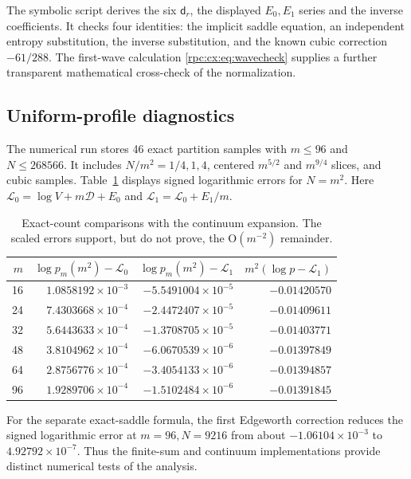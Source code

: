 \documentclass[11pt]{article}
\theoremstyle{definition}
\theoremstyle{remark}
\numberwithin{equation}{section}
\begin{document}
The symbolic script derives the six $\mathsf d_r$, the displayed $E_0,E_1$
series and the inverse coefficients. It checks four identities:
the implicit saddle equation, an independent entropy substitution,
the inverse substitution, and the known cubic correction $-61/288$.
The first-wave calculation \eqref{rpc:cx:eq:wavecheck} supplies a further
transparent mathematical cross-check of the normalization.

\subsection{Uniform-profile diagnostics}
The numerical run stores 46 exact partition samples with $m\le96$ and
$N\le268566$. It includes $N/m^2=1/4,1,4$, centered $m^{5/2}$ and
$m^{9/4}$ slices, and cubic samples. Table~\ref{rpc:cx:tab:errors} displays
signed logarithmic errors for $N=m^2$.
Here $\mathcal L_0=\log V+m\mathcal D+E_0$ and
$\mathcal L_1=\mathcal L_0+E_1/m$.

\begin{table}[ht]
\centering\small
\begin{tabular}{rrrr}
\toprule
$m$ & $\log p_m(m^2)-\mathcal L_0$ &
$\log p_m(m^2)-\mathcal L_1$ & $m^2(\log p-\mathcal L_1)$\\
\midrule
16 & $1.0858192\times10^{-3}$ & $-5.5491004\times10^{-5}$ & $-0.01420570$\\
24 & $7.4303668\times10^{-4}$ & $-2.4472407\times10^{-5}$ & $-0.01409611$\\
32 & $5.6443633\times10^{-4}$ & $-1.3708705\times10^{-5}$ & $-0.01403771$\\
48 & $3.8104962\times10^{-4}$ & $-6.0670539\times10^{-6}$ & $-0.01397849$\\
64 & $2.8756776\times10^{-4}$ & $-3.4054133\times10^{-6}$ & $-0.01394857$\\
96 & $1.9289706\times10^{-4}$ & $-1.5102484\times10^{-6}$ & $-0.01391845$\\
\bottomrule
\end{tabular}
\caption{Exact-count comparisons with the continuum expansion.
The scaled errors support, but do not prove, the $\mathrm O(m^{-2})$ remainder.}
\label{rpc:cx:tab:errors}
\end{table}

For the separate exact-saddle formula, the first Edgeworth correction
reduces the signed logarithmic error at $m=96,N=9216$ from about
$-1.06104\times10^{-3}$ to $4.92792\times10^{-7}$.
Thus the finite-sum and continuum implementations provide distinct
numerical tests of the analysis.
\end{document}
